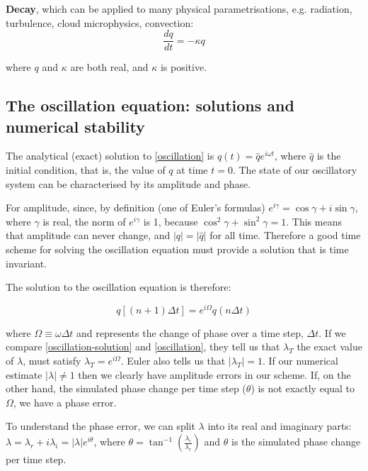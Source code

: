 {\bf Decay}, which can be applied to many physical parametrisations, e.g. radiation, turbulence, cloud microphysics, convection:
\begin{equation}
	\frac{dq}{dt}= - \kappa q
	\label{decay}
\end{equation}

where $q$ and $\kappa$ are both real, and $\kappa$ is positive.

\subsection{The oscillation equation: solutions and numerical stability}
The analytical (exact) solution to \ref{oscillation} is $q(t) = \hat{q} e^{i \omega t}$, where $\hat{q}$ is the initial condition, that is, the value of $q$ at time $t=0$. The state of our oscillatory system can be characterised by its amplitude and phase.

For amplitude, since, by definition (one of Euler's formulas) $e^{i\gamma} = \cos{\gamma}+i\sin{\gamma}$, where $\gamma$ is real, the norm of $e^{i\gamma}$ is 1, because  $\cos^2{\gamma}+\sin^2{\gamma} =1$. This means that amplitude can never change, and $|q|=|\hat{q}|$ for all time. Therefore a good time scheme for solving the oscillation equation must provide a solution that is time invariant.

The solution to the oscillation equation is therefore:

\begin{equation}
	q [(n+1)\Delta t ] = e^{i\Omega} q(n\Delta t)
	\label{oscillation-solution}
\end{equation}

where $\Omega \equiv \omega \Delta t$ and represents the change of phase over a time step, $\Delta t$. If we compare \ref{oscillation-solution} and \ref{oscillation}, they tell us that $\lambda_T$ the exact value of $\lambda$, must satisfy $\lambda_T=e^{i\Omega} $. Euler also tells us that  $|\lambda_T|=1$. If our numerical estimate $|\lambda|\ne1$ then we clearly have amplitude errors in our scheme. If, on the other hand, the simulated phase change per time step ($\theta$) is not exactly equal to $\Omega$, we have a phase error.

To understand the phase error, we can split $\lambda$ into its real and imaginary parts: $\lambda=\lambda_r + i \lambda_i=|\lambda|e^{i\theta}$, where $\theta = \tan^{-1}\left(\frac{\lambda_i}{\lambda_r}\right)$ and $\theta$ is the simulated phase change per time step.

